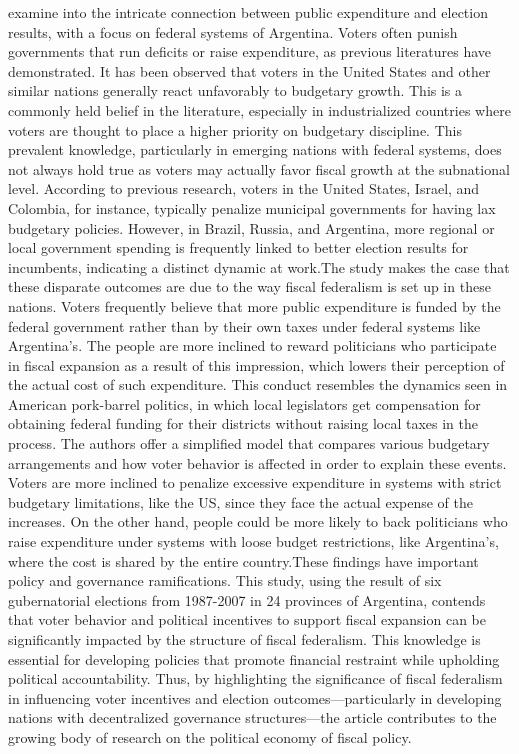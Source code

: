  examine into the intricate connection between public expenditure and election results, with a focus on federal systems of Argentina. Voters often punish governments that run deficits or raise expenditure, as previous literatures have demonstrated. It has been observed that voters in the United States and other similar nations generally react unfavorably to budgetary growth. This is a commonly held belief in the literature, especially in industrialized countries where voters are thought to place a higher priority on budgetary discipline. This prevalent knowledge, particularly in emerging nations with federal systems, does not always hold true as voters may actually favor fiscal growth at the subnational level. According to previous research, voters in the United States, Israel, and Colombia, for instance, typically penalize municipal governments for having lax budgetary policies. However, in Brazil, Russia, and Argentina, more regional or local government spending is frequently linked to better election results for incumbents, indicating a distinct dynamic at work.The study makes the case that these disparate outcomes are due to the way fiscal federalism is set up in these nations. Voters frequently believe that more public expenditure is funded by the federal government rather than by their own taxes under federal systems like Argentina's. The people are more inclined to reward politicians who participate in fiscal expansion as a result of this impression, which lowers their perception of the actual cost of such expenditure. This conduct resembles the dynamics seen in American pork-barrel politics, in which local legislators get compensation for obtaining federal funding for their districts without raising local taxes in the process. The authors offer a simplified model that compares various budgetary arrangements and how voter behavior is affected in order to explain these events. Voters are more inclined to penalize excessive expenditure in systems with strict budgetary limitations, like the US, since they face the actual expense of the increases. On the other hand, people could be more likely to back politicians who raise expenditure under systems with loose budget restrictions, like Argentina's, where the cost is shared by the entire country.These findings have important policy and governance ramifications. This study, using the result of six gubernatorial elections from 1987-2007 in 24 provinces of Argentina, contends that voter behavior and political incentives to support fiscal expansion can be significantly impacted by the structure of fiscal federalism. This knowledge is essential for developing policies that promote financial restraint while upholding political accountability. Thus, by highlighting the significance of fiscal federalism in influencing voter incentives and election outcomes—particularly in developing nations with decentralized governance structures—the article contributes to the growing body of research on the political economy of fiscal policy.\par
